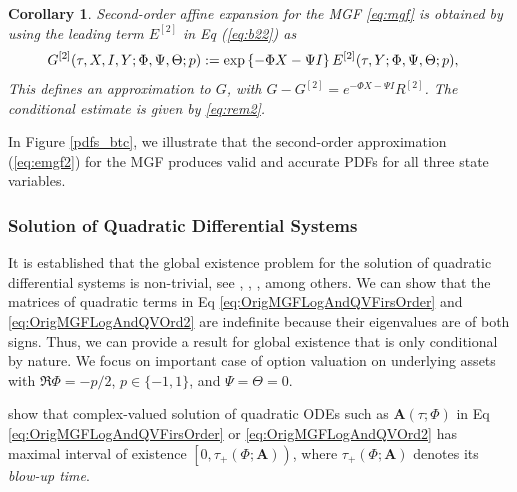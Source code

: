 \documentclass[11pt,a4paper] {article}
\newtheorem{corollary}{Corollary}[section]
\begin{document}
\begin{corollary} \label {pr:emgf2} Second-order affine expansion for the MGF \eqref{eq:mgf} is obtained by using the leading term $E^{[2]}$ in Eq (\ref{eq:b22}) as
\begin{equation}\label{eq:emgf2}
\begin{split}
& G^{[2]}(\tau,X,I,Y; \Phi,\Psi,\Theta;p) :=  \exp \left\{-\Phi X-\Psi I \right\} E^{[2]}(\tau,Y; \Phi,\Psi,\Theta;p),\vspace*{-1.0\baselineskip}
\end{split}
\end{equation}
This defines an approximation to $G$, with $G-G^{[2]}=e^{-\Phi X-\Psi I}R^{[2]}$. The conditional estimate is given by \eqref{eq:rem2}.
\end{corollary}

In Figure \ref{pdfs_btc}, we illustrate that the second-order approximation (\ref{eq:emgf2}) for the MGF produces valid and accurate PDFs for all three state variables.





\subsubsection{Solution of Quadratic Differential Systems}\label{sec:sol}


It is established that the global existence problem for the solution of quadratic differential systems is non-trivial, see \cite{Coppel1966}, \cite{Perko1970}, \cite{Jacobson1977}, \cite{Baris2008} among others. We can show that the matrices of quadratic terms in Eq \eqref{eq:OrigMGFLogAndQVFirsOrder} and \eqref{eq:OrigMGFLogAndQVOrd2} are indefinite because their eigenvalues are of both signs. Thus, we can provide a result for global existence that is only conditional by nature. We focus on important case of option valuation on underlying assets with $\Re \Phi=-p/2$, $p\in\{-1,1\}$, and $\Psi=\Theta=0$.

\cite{Perko1970} show that complex-valued solution of quadratic ODEs such as $\mathbf{A}(\tau;\Phi)$ in Eq \eqref{eq:OrigMGFLogAndQVFirsOrder} or \eqref{eq:OrigMGFLogAndQVOrd2} has maximal interval of existence $\left[0,\tau_+(\Phi;\mathbf{A})\right)$, where $\tau_+(\Phi;\mathbf{A})$ denotes its {\it blow-up time}.
\end{document}
